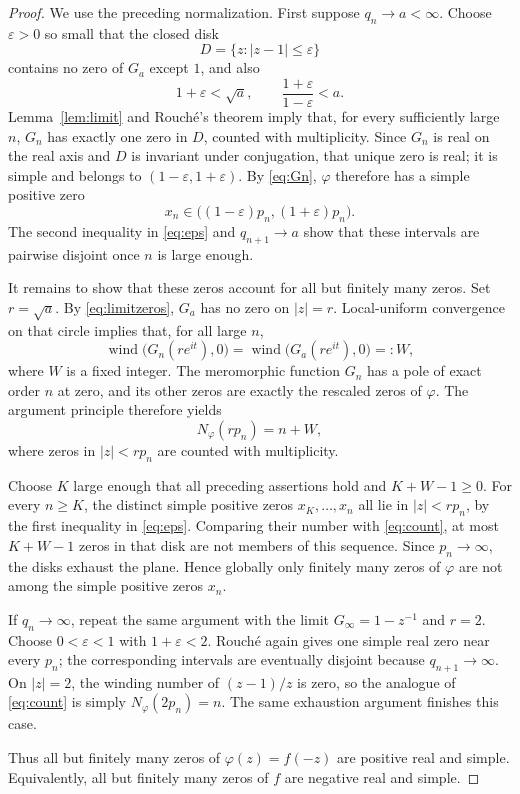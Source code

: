 \documentclass[11pt]{article}
\newcommand{\wind}{\operatorname{wind}}
\begin{document}
\begin{proof}
We use the preceding normalization.  First suppose $q_n\to a<\infty$.
Choose $\varepsilon>0$ so small that the closed disk
\[
 D=\{z:|z-1|\leq\varepsilon\}
\]
contains no zero of $G_a$ except $1$, and also
\begin{equation}\label{eq:eps}
 1+\varepsilon<\sqrt a,
 \qquad
 \frac{1+\varepsilon}{1-\varepsilon}<a.
\end{equation}
Lemma~\ref{lem:limit} and Rouch\'e's theorem imply that, for every
sufficiently large $n$, $G_n$ has exactly one zero in $D$, counted with
multiplicity.  Since $G_n$ is real on the real axis and $D$ is invariant
under conjugation, that unique zero is real; it is simple and belongs to
$(1-\varepsilon,1+\varepsilon)$.  By \eqref{eq:Gn}, $\varphi$ therefore
has a simple positive zero
\begin{equation}\label{eq:xn}
 x_n\in\bigl((1-\varepsilon)p_n,(1+\varepsilon)p_n\bigr).
\end{equation}
The second inequality in \eqref{eq:eps} and $q_{n+1}\to a$ show that
these intervals are pairwise disjoint once $n$ is large enough.

It remains to show that these zeros account for all but finitely many zeros.
Set $r=\sqrt a$.  By \eqref{eq:limitzeros}, $G_a$ has no zero on
$|z|=r$.  Local-uniform convergence on that circle implies that, for all
large $n$,
\[
 \wind\bigl(G_n(r e^{it}),0\bigr)
 =\wind\bigl(G_a(r e^{it}),0\bigr)=:W,
\]
where $W$ is a fixed integer.  The meromorphic function $G_n$ has a pole
of exact order $n$ at zero, and its other zeros are exactly the rescaled
zeros of $\varphi$.  The argument principle therefore yields
\begin{equation}\label{eq:count}
 N_\varphi(rp_n)=n+W,
\end{equation}
where zeros in $|z|<rp_n$ are counted with multiplicity.

Choose $K$ large enough that all preceding assertions hold and
$K+W-1\geq0$.  For every $n\geq K$, the distinct simple positive zeros
$x_K,\ldots,x_n$ all lie in $|z|<rp_n$, by the first inequality in
\eqref{eq:eps}.  Comparing their number with \eqref{eq:count}, at most
$K+W-1$ zeros in that disk are not members of this sequence.  Since
$p_n\to\infty$, the disks exhaust the plane.  Hence globally only finitely
many zeros of $\varphi$ are not among the simple positive zeros $x_n$.

If $q_n\to\infty$, repeat the same argument with the limit
$G_\infty=1-z^{-1}$ and $r=2$.  Choose $0<\varepsilon<1$ with
$1+\varepsilon<2$.  Rouch\'e again gives one simple real zero near every
$p_n$; the corresponding intervals are eventually disjoint because
$q_{n+1}\to\infty$.  On $|z|=2$, the winding number of
$(z-1)/z$ is zero, so the analogue of \eqref{eq:count} is simply
$N_\varphi(2p_n)=n$.  The same exhaustion argument finishes this case.

Thus all but finitely many zeros of $\varphi(z)=f(-z)$ are positive real
and simple.  Equivalently, all but finitely many zeros of $f$ are negative
real and simple.
\end{proof}
\end{document}
